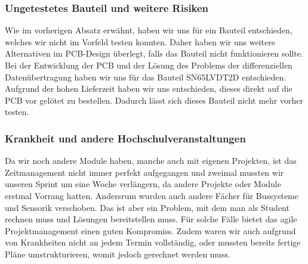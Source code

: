 \subsubsection{Ungetestetes Bauteil und weitere Risiken}
Wie im vorherigen Absatz erwähnt, haben wir uns für ein Bauteil entschieden, welches wir nicht im Vorfeld testen konnten. Daher haben wir uns weitere Alternativen im PCB-Design überlegt, falls das Bauteil nicht funktionieren sollte. Bei der Entwicklung der PCB und der Lösung des Problems der differenziellen Datenübertragung haben wir uns für das Bauteil SN65LVDT2D entschieden. Aufgrund der hohen Lieferzeit haben wir uns entschieden, dieses direkt auf die PCB vor gelötet zu bestellen. Dadurch lässt sich dieses Bauteil nicht mehr vorher testen. 

\subsubsection{Krankheit und andere Hochschulveranstaltungen}
Da wir noch andere Module haben, manche auch mit eigenen Projekten, ist das Zeitmanagement nicht immer perfekt aufgegangen und zweimal mussten wir unseren Sprint um eine Woche verlängern, da andere Projekte oder Module erstmal Vorrang hatten. Andersrum wurden auch andere Fächer für Bussysteme und Sensorik verschoben. Das ist aber ein Problem, mit dem man als Student rechnen muss und Lösungen bereitstellen muss. Für solche Fälle bietet das agile Projektmanagement einen guten Kompromiss. Zudem waren wir auch aufgrund von Krankheiten nicht an jedem Termin vollständig, oder mussten bereits fertige Pläne umstrukturieren, womit jedoch gerechnet werden muss.

